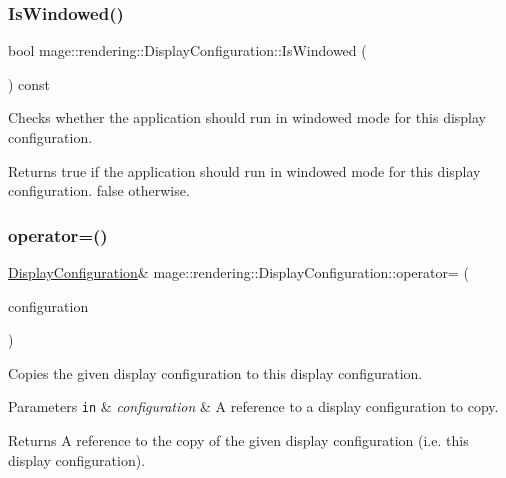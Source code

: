 \subsubsection{\texorpdfstring{Is\+Windowed()}{IsWindowed()}}
{\footnotesize\ttfamily bool mage\+::rendering\+::\+Display\+Configuration\+::\+Is\+Windowed (\begin{DoxyParamCaption}{ }\end{DoxyParamCaption}) const\hspace{0.3cm}{\ttfamily [noexcept]}}

Checks whether the application should run in windowed mode for this display configuration.

\begin{DoxyReturn}{Returns}
{\ttfamily true} if the application should run in windowed mode for this display configuration. {\ttfamily false} otherwise. 
\end{DoxyReturn}
\hypertarget{classmage_1_1rendering_1_1_display_configuration_a847151bc6a61f320811e915119f38f9f}{}\label{classmage_1_1rendering_1_1_display_configuration_a847151bc6a61f320811e915119f38f9f} 
\subsubsection{\texorpdfstring{operator=()}{operator=()}\hspace{0.1cm}{\footnotesize\ttfamily [1/2]}}
{\footnotesize\ttfamily \hyperlink{classmage_1_1rendering_1_1_display_configuration}{Display\+Configuration}\& mage\+::rendering\+::\+Display\+Configuration\+::operator= (\begin{DoxyParamCaption}\item[{const \hyperlink{classmage_1_1rendering_1_1_display_configuration}{Display\+Configuration} \&}]{configuration }\end{DoxyParamCaption})\hspace{0.3cm}{\ttfamily [default]}}

Copies the given display configuration to this display configuration.


\begin{DoxyParams}[1]{Parameters}
\mbox{\tt in}  & {\em configuration} & A reference to a display configuration to copy. \\
\hline
\end{DoxyParams}
\begin{DoxyReturn}{Returns}
A reference to the copy of the given display configuration (i.\+e. this display configuration). 
\end{DoxyReturn}
\hypertarget{classmage_1_1rendering_1_1_display_configuration_a309591557673c77b7157012136fe2fc9}{}\label{classmage_1_1rendering_1_1_display_configuration_a309591557673c77b7157012136fe2fc9} 
